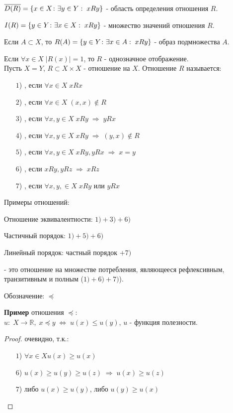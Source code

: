 $\overline{D(R)} = \left\{x \in X\colon\exists y \in Y: \; xRy\right\}$ - область определения отношения $R$.

$I(R) = \left\{y \in Y\colon\exists x \in X: \; xRy\right\}$ - множество значений отношения $R$.

Если $A \subset X$, то $R(A) = \left\{y \in Y\colon\exists x \in A: \; xRy\right\}$ - образ подмножества $A$.

Если $\forall x \in X \; |R(x)| = 1$, то $R$ - однозначное отображение.\\

Пусть $X=Y$, $R \subset X\times X$ - отношение на $X$. Отношение $R$ называется:
\begin{itemize}
	\item[$1$)]
		, если $\forall x \in X \; xRx$
	\item[$2$)]
		, если $\forall x \in X \; (x,x) \not \in R$
	\item[$3$)]
		, если $\forall x, y \in X \; xRy \; \Rightarrow \; yRx$
	\item[$4$)]
		, если $\forall x, y \in X \; xRy \; \Rightarrow \; (y,x) \not \in R$
	\item[$5$)]
		, если $\forall x, y \in X \; xRy, yRx \; \Rightarrow \; x = y$
	\item[$6$)]
		, если $xRy, yRz \; \Rightarrow \; xRz$
	\item[$7$)]
		, если $\forall x, y, \in X \; xRy$ или $yRx$
\end{itemize}

\begin{example}\label{cha:1/example:1}
	Примеры отношений:

	Отношение эквивалентности: $1) + 3) + 6)$

	Частичный порядок: $1) + 5) + 6)$

	Линейный порядок: частный порядок $+ 7)$
\end{example}

\begin{definition}\label{cha:1/def:4}
	 - это отношение на множестве потребления, являющееся рефлексивным, транзитивным и полным ($1) + 6) + 7)$).

	Обозначение: $\preceq$
\end{definition}

\textbf{Пример} отношения $\preceq$:\\

$u: \; X \to \mathbb{R}, \; x \preceq y \; \Leftrightarrow \; u(x) \le u(y)$, $u$ - функция полезности.
\begin{proof}
	очевидно, т.к.:
	\begin{itemize}
		\item[$1$)]
			$\forall x \in X u(x) \ge u(x)$
		\item[$6$)]
			$u(x) \ge u(y) \ge u(z) \; \Rightarrow \; u(x) \ge u(z)$
		\item[$7$)]
			либо $u(x) \ge u(y)$, либо $u(y) \ge u(x)$
	\end{itemize}
\end{proof}

